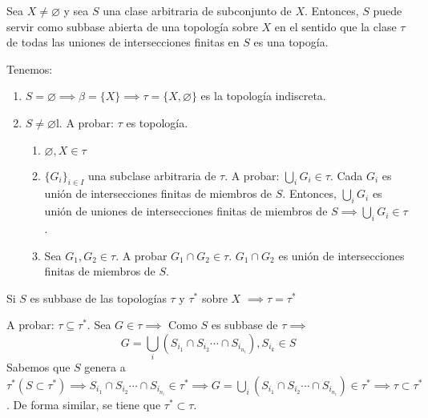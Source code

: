 \begin{teorema}
    Sea $X\neq \varnothing$ y sea $S$ una clase arbitraria de subconjunto de $X$. Entonces, $S$ puede servir como subbase abierta de una topología sobre $X$ en el sentido que la clase $\tau$ de todas las uniones de intersecciones finitas en $S$ es una topogía. 
    \begin{dem}
        Tenemos:
        \begin{enumerate}
            \item $S=\varnothing\implies \beta =\{X\}\implies \tau=\{X,\varnothing\}$ es la topología indiscreta.
            \item $S\neq \varnothing$l. A probar: $\tau$ es topología. 
            \begin{enumerate}
                \item $\varnothing, X\in \tau $
                \item $\{G_i\}_{i\in I}$ una subclase arbitraria de $\tau$. A probar: $\bigcup_i G_i\in \tau$. Cada $G_i$ es unión de intersecciones finitas de miembros de $S$. Entonces, $\bigcup_i G_i$ es unión de uniones de intersecciones finitas de miembros de $S \implies \bigcup_i G_i\in \tau$. 
                \item Sea $G_1,G_2\in \tau$. A probar $G_1\cap G_2\in \tau$. $G_1\cap G_2$ es unión de intersecciones finitas de miembros de $S$. 
            \end{enumerate}
        \end{enumerate}
    \end{dem}
    \begin{lema}
        Si $S$ es subbase de las topologías $\tau$ y $\tau^*$ sobre $X$ $\implies \tau = \tau^*$ 
        \begin{dem}
            A probar: $\tau\subseteq \tau^*$. Sea $G\in \tau\implies$ Como $S$ es subbase de $\tau\implies$ 
            $$G=\bigcup_i\left(S_{i_1}\cap S_{i_2}\cdots \cap S_{i_{n_i}}\right), S_{i_k}\in S$$ 
            Sabemos que $S$ genera a $\tau^* (S\subset \tau^*)\implies S_{i_1}\cap S_{i_2}\cdots \cap S_{i_{n_i}}\in \tau^*\implies G=\bigcup_i\left(S_{i_1}\cap S_{i_2}\cdots \cap S_{i_{n_i}}\right)\in \tau^*\implies \tau\subset \tau^* $. De forma similar, se tiene que $\tau^*\subset \tau$. 
        \end{dem}
    \end{lema}
\end{teorema}

